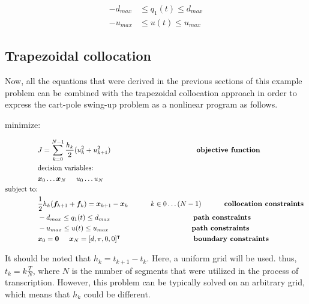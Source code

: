 \documentclass{thesisreport}
\begin{document}
\begin{equation}
\begin{aligned}
-d_{max} &\leq q_1(t) \leq d_{max}\\
-u_{max} &\leq u(t) \leq u_{max}
\end{aligned}
\end{equation}

\subsection{Trapezoidal collocation}

Now, all the equations that were derived in the previous sections of this example problem can be combined with the trapezoidal collocation approach in order to express the cart-pole swing-up problem as a nonlinear program as follows.


minimize:

\begin{align}
&J = \sum_{k=0}^{N-1} \frac{h_k}{2}(u_k^2 + u^2_{k+1}) \textbf{ \hspace{4cm} objective function} \\
&\text{decision variables:} \nonumber \\
&\bm{x}_0 \ldots\bm{x}_N \text{\hspace{0.5cm}} u_0 \ldots u_N \\
\text{subject to:} \nonumber \\
&\frac{1}{2} h_k( \bm{f}_{k+1} + \bm{f}_k) = \bm{x}_{k+1} - \bm{x}_k \text{\hspace{1cm} } k \in 0 \ldots (N-1) \textbf{\hspace{1cm} collocation constraints }\\
&-d_{max} \leq q_1(t) \leq d_{max} \textbf{\hspace{4cm} path constraints} \\
&-u_{max} \leq u(t) \leq u_{max} \textbf{\hspace{4cm} path constraints} \\
&\bm{x}_0 = \bm{0} \text{\hspace{0.5cm}} \bm{x}_N=[d,\pi,0,0]^{\intercal} \textbf{\hspace{3.5cm} boundary constraints}
\end{align}


It should be noted that $h_k = t_{k+1} - t_k$. Here, a uniform grid will be used. thus, $t_k = k \frac{T}{N}$, where $N$ is the number of segments that were utilized in the process of transcription. However, this problem can be typically solved on an arbitrary grid, which means that $h_k$ could be different.
\end{document}
